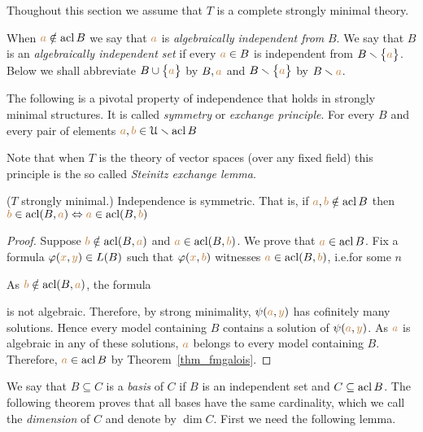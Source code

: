Thoughout this section we assume that $T$ is a complete strongly minimal theory.
 

When ${\color{brown} a}\notin\mathop{\rm acl} B$ we say that ${\color{brown} a}$ is \emph{algebraically independent from\/} $B$.
We say that $B$ is an \emph{algebraically independent set\/} if every ${\color{brown} a}\in B$ is independent from $B\smallsetminus\big\{{\color{brown} a}\big\}$.
Below we shall abbreviate $B\cup\big\{{\color{brown} a}\big\}$ by \emph{$B,{\color{brown} a}$} and  $B\smallsetminus\big\{{\color{brown} a}\big\}$ by \emph{$B\smallsetminus{\color{brown}a}$}.


The following is a pivotal property of independence that holds in strongly minimal structures.
It is called \emph{symmetry\/} or \emph{exchange principle}.
For every $B$ and every pair of elements ${\color{brown} a},{\color{brown} b}\in\EuScript U\smallsetminus\mathop{\rm acl} B$


Note that when $T$ is the theory of vector spaces (over any fixed field) this principle is the so called \emph{Steinitz exchange lemma}.

\begin{theorem} 
($T$ strongly minimal.) Independence is symmetric.
That is, if ${\color{brown} a},{\color{brown} b}\notin\mathop{\rm acl} B$ then ${\color{brown} b}\in\mathop{\rm acl} (B,{\color{brown} a})\Leftrightarrow{\color{brown}a}\in\mathop{\rm acl}(B,{\color{brown} b})$
\end{theorem} 

\begin{proof} 
Suppose ${\color{brown} b}\notin\mathop{\rm acl}(B,{\color{brown} a})$ and ${\color{brown} a}\in\mathop{\rm acl}(B,{\color{brown} b})$.
We prove that ${\color{brown} a}\in\mathop{\rm acl} B$.
Fix a formula $\varphi({\color{brown} x},{\color{brown} y})\in L(B)$ such that $\varphi({\color{brown} x},{\color{brown} b})$ witnesses ${\color{brown} a}\in\mathop{\rm acl}(B,{\color{brown} b})$, i.e.\@ for some $n$


As ${\color{brown} b}\notin\mathop{\rm acl}(B,{\color{brown} a})$, the formula


is not algebraic.
Therefore, by strong minimality, $\psi({\color{brown} a},{\color{brown} y})$ has cofinitely many solutions.
Hence every model containing $B$ contains a solution of $\psi({\color{brown} a},{\color{brown} y})$.
As ${\color{brown} a}$ is algebraic in any of these solutions, ${\color{brown} a}$ belongs to every model containing $B$.
Therefore, ${\color{brown} a}\in\mathop{\rm acl} B$ by Theorem~\ref{thm_fmgalois}.
\end{proof}

We say that $B\subseteq C$ is a \emph{basis\/} of $C$ if $B$ is an independent set and $C\subseteq\mathop{\rm acl} B$.
The following theorem proves that all bases have the same cardinality, which we call the  \emph{dimension\/} of $C$ and denote by \emph{$\dim C$}.
First we need the following lemma.

